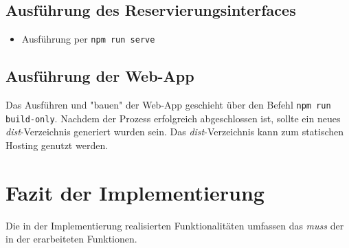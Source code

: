 \subsection{Ausführung des Reservierungsinterfaces}
\begin{itemize}
  \item Ausführung per \lstinline{npm run serve}
\end{itemize}

\subsection{Ausführung der Web-App}
Das Ausführen und "bauen" der Web-App geschieht über den Befehl \lstinline{npm run build-only}.
Nachdem der Prozess erfolgreich abgeschlossen ist, sollte ein neues \textit{dist}-Verzeichnis
generiert wurden sein. Das \textit{dist}-Verzeichnis kann zum statischen Hosting genutzt werden.


\section{Fazit der Implementierung}

Die in der Implementierung realisierten Funktionalitäten umfassen das \textit{muss} der in der
 erarbeiteten Funktionen. 
